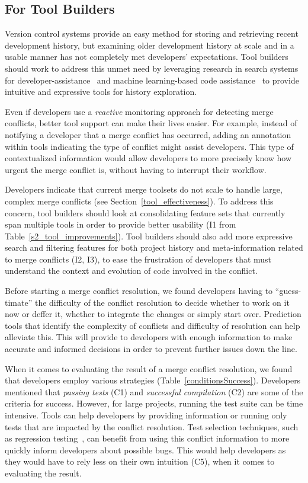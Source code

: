 \subsection{For Tool Builders}
Version control systems provide an easy method for storing and retrieving recent development history, but examining older development history at scale and in a usable manner has not completely met developers' expectations.
Tool builders should work to address this unmet need by leveraging research in search systems for developer-assistance~\cite{nabi2016putting} and machine learning-based code assistance~\cite{bradley2011history_exploration} to provide intuitive and expressive tools for history exploration.

Even if developers use a \emph{reactive} monitoring approach for detecting merge conflicts, better tool support can make their lives easier.
For example, instead of notifying a developer that a merge conflict has occurred, adding an annotation within tools indicating the type of conflict might assist developers.
This type of contextualized information would allow developers to more precisely know how urgent the merge conflict is, without having to interrupt their workflow.

Developers indicate that current merge toolsets do not scale to handle large, complex merge conflicts (see Section~\ref{tool_effectiveness}).
To address this concern, tool builders should look at consolidating feature sets that currently span multiple tools in order to provide better usability (I1 from Table~\ref{s2_tool_improvements}).
Tool builders should also add more expressive search and filtering features for both project history and meta-information related to merge conflicts (I2, I3), to ease the frustration of developers that must understand the context and evolution of code involved in the conflict.

Before starting a merge conflict resolution, we found developers having to ``guess-timate'' the difficulty of the conflict resolution to decide whether to work on it now or deffer it, whether to integrate the changes or simply start over. 
Prediction tools that identify the complexity of conflicts and difficulty of resolution can help alleviate this.
This will provide to developers with enough information to make accurate and informed decisions in order to prevent further issues down the line.

When it comes to evaluating the result of a merge conflict resolution, we found that developers employ various strategies (Table~\ref{conditionsSuccess}).
Developers mentioned that \textit{passing tests} (C1) and \textit{successful compilation} (C2) are some of the criteria for success.
However, for large projects, running the test suite can be time intensive.
Tools can help developers by providing information or running only tests that are impacted by the conflict resolution.
Test selection techniques, such as regression testing~\cite{gligoric2015practical}, can benefit from using this conflict information to more quickly inform developers about possible bugs.
This would help developers as they would have to rely less on their own intuition (C5), when it comes to evaluating the result.

